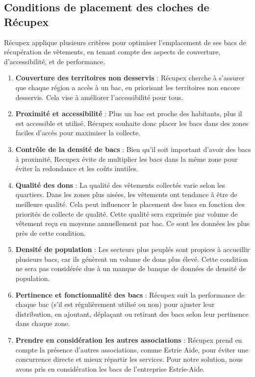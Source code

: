 \documentclass[11pt]{article}
\begin{document}
\subsection{Conditions de placement des cloches de Récupex}
Récupex applique plusieurs critères pour optimiser l’emplacement de ses bacs de récupération de vêtements, en tenant compte des aspects de couverture, d'accessibilité, et de performance.

\begin{enumerate}
    \item \textbf{Couverture des territoires non desservis} : Récupex cherche à s’assurer que chaque région a accès à un bac, en priorisant les territoires non encore desservis. Cela vise à améliorer l’accessibilité pour tous.

    \item \textbf{Proximité et accessibilité} : Plus un bac est proche des habitants, plus il est accessible et utilisé. Récupex souhaite donc placer les bacs dans des zones faciles d’accès pour maximiser la collecte.

    \item \textbf{Contrôle de la densité de bacs} : Bien qu’il soit important d’avoir des bacs à proximité, Recupex évite de multiplier les bacs dans la même zone pour éviter la redondance et les coûts inutiles.

    \item\textbf{Qualité des dons} : La qualité des vêtements collectés varie selon les quartiers. Dans les zones plus aisées, les vêtements ont tendance à être de meilleure qualité. Cela peut influencer le placement des bacs en fonction des priorités de collecte de qualité. Cette qualité sera exprimée par volume de vêtement reçu en moyenne annuellement par bac. Ce sont les données les plus près de cette condition.

    \item\textbf{Densité de population} : Les secteurs plus peuplés sont propices à accueillir plusieurs bacs, car ils génèrent un volume de dons plus élevé. Cette condition ne sera pas considérée due à un manque de banque de données de densité de population.

    \item\textbf{Pertinence et fonctionnalité des bacs} : Récupex suit la performance de chaque bac (s’il est régulièrement utilisé ou non) pour ajuster leur distribution, en ajoutant, déplaçant ou retirant des bacs selon leur pertinence dans chaque zone.

    \item\textbf{Prendre en considération les autres associations} : Récupex prend en compte la présence d’autres associations, comme Estrie Aide, pour éviter une concurrence directe et mieux répartir les services. Pour notre solution, nous avons pris en considération les bacs de l'entreprise Estrie-Aide.


\end{enumerate}
\end{document}
